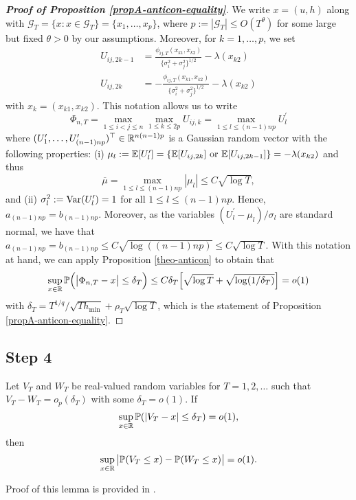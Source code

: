 \documentclass[a4paper,12pt]{article}
\begin{document}
\begin{proof}[\textnormal{\textbf{Proof of Proposition \ref{propA-anticon-equality}}}] 

We write $x = (u,h)$ along with $\mathcal{G}_T = \{ x : x \in \mathcal{G}_T \} = \{x_1,\ldots,x_p\}$, where $p := |\mathcal{G}_T| \le O(T^\theta)$ for some large but fixed $\theta > 0$ by our assumptions. Moreover, for $k = 1,\ldots,p$, we set 
\begin{align*}
U_{ij, 2k-1} & = \frac{\phi_{ij, T}(x_{k1},x_{k2})}{\{{\sigma}_i^2 + {\sigma}_j^2\}^{1/2}} - \lambda(x_{k2}) \\
U_{ij, 2k} & = -\frac{\phi_{ij, T}(x_{k1},x_{k2})}{\{{\sigma}_i^2 + {\sigma}_j^2\}^{1/2}} - \lambda(x_{k2}) 
\end{align*}
with $x_k = (x_{k1},x_{k2})$. This notation allows us to write
\[ \Phi_{n, T} = \max_{1\le i < j \le n} \max_{1 \le k \le 2p} U_{ij, k} = \max_{1 \leq l \leq (n-1)np} U^\prime_l\]
where $(U^\prime_{1},\ldots,U^\prime_{(n-1)np})^\top \in \mathbb{R}^{n(n-1)p}$ is a Gaussian random vector with the following properties: (i) $\mu_{l} := \mathbb{E}[U^\prime_l] = \{\mathbb{E}[U_{ij, 2k}] \text{ or }\mathbb{E}[U_{ij, 2k-1}]\}= - \lambda(x_{k2}) $ and thus
$$\overline{\mu} = \max_{1\leq l \leq (n-1)np} |\mu_{l}| \leq C \sqrt{\log T},$$
and (ii) $\sigma_{l}^2 := \textnormal{Var}(U^\prime_{l}) = 1$ for all $1 \leq l \leq (n-1)np$. Hence, $a_{(n-1)np} = b_{(n-1)np}$. Moreover, as the variables $(U^\prime_l - \mu_l)/\sigma_l$ are standard normal, we have that $a_{(n-1)np} = b_{(n-1)np} \le C\sqrt{\log ((n-1)np)} \leq C \sqrt{\log T}$. With this notation at hand, we can apply Proposition \ref{theo-anticon} to obtain that 
\[ \sup_{x \in \mathbb{R}} \mathbb{P} \Big( \big| \Phi_{n, T} - x \big| \le \delta_T \Big) \le C \delta_T \Big[ \sqrt{\log T} + \sqrt{ \log(1/\delta_T) } \Big] = o(1) \]
with $\delta_T = T^{1/q} / \sqrt{T h_{\min}} + \rho_T \sqrt{\log T}$, which is the statement of Proposition \ref{propA-anticon-equality}.
\end{proof}

\subsection*{Step 4}


\begin{lemmaA}\label{lemma1-theo-stat}
Let $V_T$ and $W_T$ be real-valued random variables for $T = 1,2,\ldots$ such that $V_T - W_T = o_p(\delta_T)$ with some $\delta_T = o(1)$. If 
\begin{equation}\label{eq-lemma1-cond}
\sup_{x \in \mathbb{R}} \mathbb{P}(|V_T - x| \le \delta_T) = o(1), 
\end{equation}
then 
\begin{equation}\label{eq-lemma1-statement}
\sup_{x \in \mathbb{R}} \big| \mathbb{P}(V_T \le x) - \mathbb{P}(W_T \le x) \big| = o(1). 
\end{equation}
\end{lemmaA}
Proof of this lemma is provided in \cite*{KhismatullinaVogt2018}.
\end{document}

